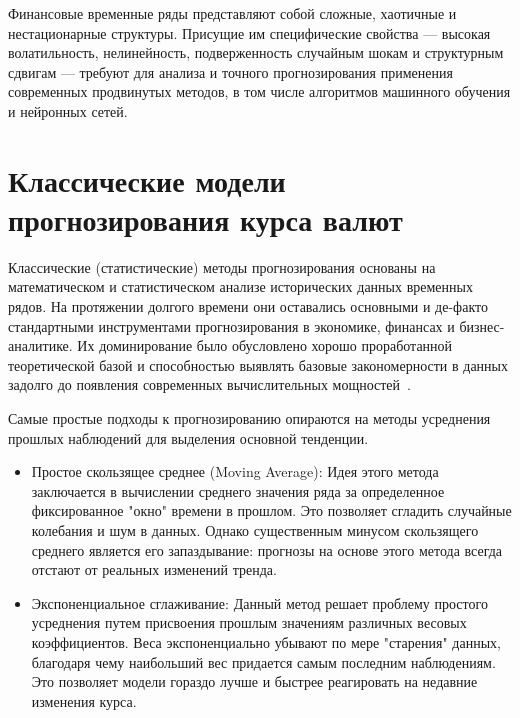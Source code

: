 Финансовые временные ряды представляют собой сложные, хаотичные и нестационарные структуры. Присущие им специфические свойства — высокая волатильность, нелинейность, подверженность случайным шокам и структурным сдвигам — требуют для анализа и точного прогнозирования применения современных продвинутых методов, в том числе алгоритмов машинного обучения и нейронных сетей.

\section{Классические модели прогнозирования курса валют}
Классические (статистические) методы прогнозирования основаны на математическом и статистическом анализе исторических данных временных рядов. На протяжении долгого времени они оставались основными и де-факто стандартными инструментами прогнозирования в экономике, финансах и бизнес-аналитике. Их доминирование было обусловлено хорошо проработанной теоретической базой и способностью выявлять базовые закономерности в данных задолго до появления современных вычислительных мощностей~\cite{aivazyan2001v2, kremer2010}.

\sloppy
Самые простые подходы к прогнозированию опираются на методы усреднения прошлых наблюдений для выделения основной тенденции.
\begin{itemize}
    \item Простое скользящее среднее (Moving Average): Идея этого метода заключается в вычислении среднего значения ряда за определенное фиксированное "окно" времени в прошлом. Это позволяет сгладить случайные колебания и шум в данных. Однако существенным минусом скользящего среднего является его запаздывание: прогнозы на основе этого метода всегда отстают от реальных изменений тренда.
    \item Экспоненциальное сглаживание: Данный метод решает проблему простого усреднения путем присвоения прошлым значениям различных весовых коэффициентов. Веса экспоненциально убывают по мере "старения" данных, благодаря чему наибольший вес придается самым последним наблюдениям. Это позволяет модели гораздо лучше и быстрее реагировать на недавние изменения курса.
\end{itemize}


